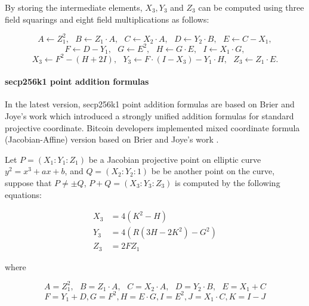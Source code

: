 By storing the intermediate elements, $X_3,Y_3$ and $Z_3$ can be computed using three field squarings and eight field multiplications as follows:

\begin{small}
$$ A \leftarrow Z_1^2, \text{ } B \leftarrow Z_1 \cdot A,  \text{ } C \leftarrow X_2 \cdot A,  \text{ } D \leftarrow Y_2 \cdot B,  \text{ }  E \leftarrow C - X_1,$$
$$ F \leftarrow D - Y_1, \text{ } G \leftarrow E^2, \text{ } H \leftarrow G \cdot E, \text{ } I \leftarrow X_1 \cdot G, $$
$$ X_3 \leftarrow F^2 - (H+2I), \text{ } Y_3 \leftarrow F \cdot (I - X_3) - Y_1 \cdot H, \text{ } Z_3 \leftarrow Z_1 \cdot E.$$
\end{small}

\paragraph{secp256k1 point addition formulas}
In the latest version, secp256k1 point addition formulas are based on Brier and Joye's work \cite{brier2002weierstrass} which introduced a strongly unified addition formulas for standard projective coordinate. Bitcoin developers implemented mixed coordinate formula (Jacobian-Affine) version based on Brier and Joye's work \cite{brier2002weierstrass}. 

Let $P = (X_1:Y_1:Z_1)$ be a Jacobian projective point on elliptic curve $y^2=x^3+ax+b$, and $Q = (X_2:Y_2:1)$ be be another point on the curve, suppose that $P \neq \pm Q$, $P+Q=(X_3:Y_3:Z_3)$ is computed by the following equations:
\begin{small}
\begin{equation} \label{eq:7m5s}
\begin{split}
X_3 &= 4 (K^2 - H) \\
Y_3 &= 4 (R(3H-2K^2)-G^2) \\
Z_3 &= 2 F  Z_1
\end{split}
\end{equation}
\end{small}
where
\begin{small}
$$ A = Z_1^2, \text{ } B = Z_1 \cdot A, \text{ } C = X_2 \cdot A, \text{ } D = Y_2 \cdot B, \text{ } E = X_1 + C $$
$$ F = Y_1 + D, G = F^2, H = E  \cdot G, I = E^2, J = X_1 \cdot C, K = I - J $$
\end{small}
